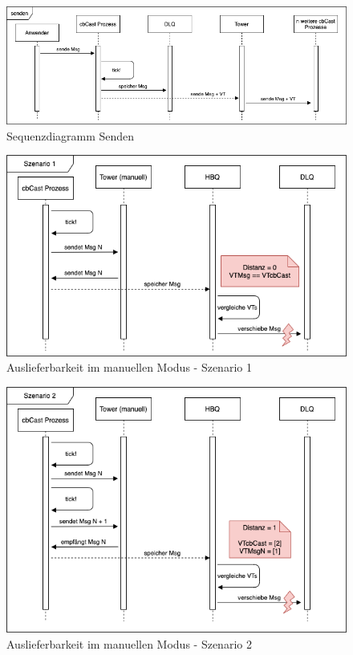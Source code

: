 \begin{figure}[htbp]
\begin{center}
\includegraphics[scale=0.5]{Latex/Bilder/Sequenz_senden.png}
\caption{\label{fig:sequence_cbCast_send} Sequenzdiagramm Senden}
\end{center}
\end{figure}

\begin{figure}[htbp]
\begin{center}
\includegraphics[scale=0.5]{Latex/Bilder/cbCast_szenario_1.png}
\caption{\label{fig:cbCast_scenario_1} Auslieferbarkeit im manuellen Modus - Szenario 1}
\end{center}
\end{figure}

\begin{figure}[htbp]
\begin{center}
\includegraphics[scale=0.5]{Latex/Bilder/cbCast_szenario_2.png}
\caption{\label{fig:cbCast_scenario_2} Auslieferbarkeit im manuellen Modus - Szenario 2}
\end{center}
\end{figure}

